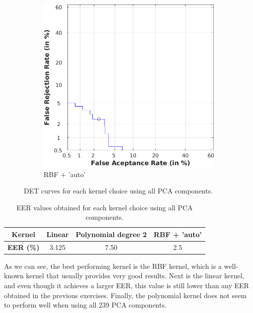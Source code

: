 \documentclass[11pt]{article}
\begin{document}
\begin{figure}[h!]
     ~\vspace{1.5em}

     \begin{subfigure}[t]{0.4\textwidth}
         \centering
         \includegraphics[scale=0.55]{img/3a_rbf_det}
         \caption{RBF + 'auto'}
     \end{subfigure}
    \caption{DET curves for each kernel choice using all PCA components.}
    \label{fig:ex3a}
\end{figure}

\begin{table}[h!]
  \centering
  \begin{tabular}{c|ccc}
    \textbf{Kernel} & Linear & Polynomial degree 2 & RBF + 'auto'\\
    \hline
    \textbf{EER (\%)} & 3.125 & 7.50 & {\color{red}2.5}\\
  \end{tabular}
  \caption{EER values obtained for each kernel choice using all PCA components.}
  \label{tab:ex3a}
\end{table}

As we can see, the best performing kernel is the RBF kernel, which is a well-known kernel that usually provides very good results. Next is the linear kernel, and even though it achieves a larger EER, this value is still lower than any EER obtained in the previous exercises. Finally, the polynomial kernel does not seem to perform well when using all 239 PCA components.
\end{document}
